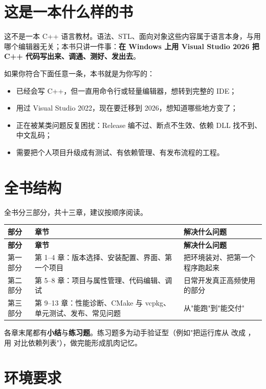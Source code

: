 \section{这是一本什么样的书}

这不是一本 C++ 语言教材。语法、STL、面向对象这些内容属于语言本身，与用哪个编辑器无关；本书只讲一件事：\textbf{在 Windows 上用 Visual Studio 2026 把 C++ 代码写出来、调通、测好、发出去}。

如果你符合下面任意一条，本书就是为你写的：

\begin{itemize}
	\item 已经会写 C++，但一直用命令行或轻量编辑器，想转到完整的 IDE；
	\item 用过 Visual Studio 2022，现在要迁移到 2026，想知道哪些地方变了；
	\item 正在被某类问题反复困扰：Release 编不过、断点不生效、依赖 DLL 找不到、中文乱码；
	\item 需要把个人项目升级成有测试、有依赖管理、有发布流程的工程。
\end{itemize}

\section{全书结构}

全书分三部分，共十三章，建议按顺序阅读。

\begin{longtable}{L{2.2cm}L{6.0cm}L{6.2cm}}
\toprule
\textbf{部分} & \textbf{章节} & \textbf{解决什么问题} \\
\midrule
\endfirsthead
\toprule
\textbf{部分} & \textbf{章节} & \textbf{解决什么问题} \\
\midrule
\endhead
\bottomrule
\endlastfoot
第一部分 & 第 1--4 章：版本选择、安装配置、界面、第一个项目 & 把环境装对、把第一个程序跑起来 \\
第二部分 & 第 5--8 章：项目与属性管理、代码编辑、调试 & 日常开发真正高频使用的部分 \\
第三部分 & 第 9--13 章：性能诊断、CMake 与 vcpkg、单元测试、发布、常见问题 & 从"能跑"到"能交付" \\
\end{longtable}

各章末尾都有\textbf{小结}与\textbf{练习题}。练习题多为动手验证型（例如"把运行库从  改成 ，用  对比依赖列表"），做完能形成肌肉记忆。

\section{环境要求}

